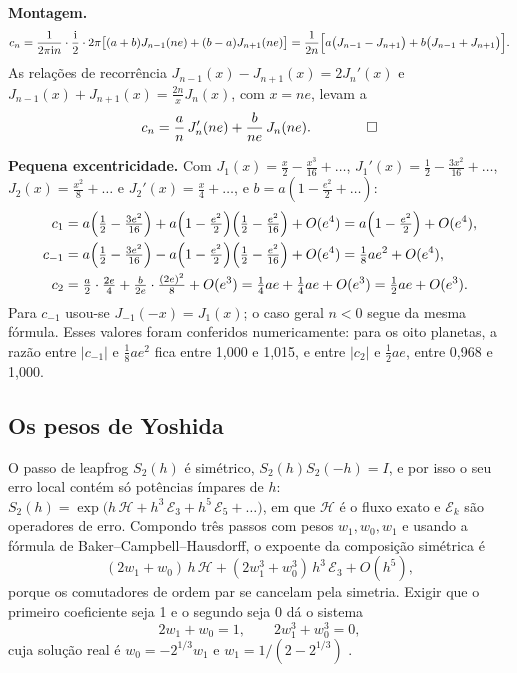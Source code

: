 \medskip\noindent\textbf{Montagem.}
\[
  c_n = \frac{1}{2\pi\mathrm{i} n}\cdot\frac{\mathrm{i}}{2}\cdot 2\pi\bigl[(a+b)J_{n-1}(ne) + (b-a)J_{n+1}(ne)\bigr]
      = \frac{1}{2n}\Bigl[a\bigl(J_{n-1}-J_{n+1}\bigr) + b\bigl(J_{n-1}+J_{n+1}\bigr)\Bigr].
\]
As relações de recorrência $J_{n-1}(x) - J_{n+1}(x) = 2J_n'(x)$ e $J_{n-1}(x)+J_{n+1}(x) = \frac{2n}{x}J_n(x)$, com $x = ne$, levam a
\[
  c_n = \frac{a}{n}\,J_n'(ne) + \frac{b}{ne}\,J_n(ne). \qquad\qed
\]

\medskip\noindent\textbf{Pequena excentricidade.} Com $J_1(x) = \frac x2 - \frac{x^3}{16} + \dots$, $J_1'(x) = \frac12 - \frac{3x^2}{16} + \dots$, $J_2(x) = \frac{x^2}{8} + \dots$ e $J_2'(x) = \frac{x}{4} + \dots$, e $b = a(1 - \frac{e^2}{2} + \dots)$:
\begin{align*}
  c_1 &= a\Bigl(\tfrac12 - \tfrac{3e^2}{16}\Bigr) + a\Bigl(1-\tfrac{e^2}{2}\Bigr)\Bigl(\tfrac12 - \tfrac{e^2}{16}\Bigr) + O(e^4) = a\Bigl(1 - \tfrac{e^2}{2}\Bigr) + O(e^4),\\
  c_{-1} &= a\Bigl(\tfrac12 - \tfrac{3e^2}{16}\Bigr) - a\Bigl(1-\tfrac{e^2}{2}\Bigr)\Bigl(\tfrac12 - \tfrac{e^2}{16}\Bigr) + O(e^4) = \tfrac18 ae^2 + O(e^4),\\
  c_2 &= \tfrac{a}{2}\cdot\tfrac{2e}{4} + \tfrac{b}{2e}\cdot\tfrac{(2e)^2}{8} + O(e^3) = \tfrac14 ae + \tfrac14 ae + O(e^3) = \tfrac12 ae + O(e^3).
\end{align*}
Para $c_{-1}$ usou-se $J_{-1}(-x) = J_1(x)$; o caso geral $n<0$ segue da mesma fórmula. Esses valores foram conferidos numericamente: para os oito planetas, a razão entre $|c_{-1}|$ e $\frac18 ae^2$ fica entre 1,000 e 1,015, e entre $|c_2|$ e $\frac12 ae$, entre 0,968 e 1,000.

\subsection{Os pesos de Yoshida}

O passo de leapfrog $S_2(h)$ é simétrico, $S_2(h)S_2(-h) = I$, e por isso o seu erro local contém só potências ímpares de $h$: $S_2(h) = \exp\bigl(h\,\mathcal{H} + h^3\,\mathcal{E}_3 + h^5\,\mathcal{E}_5 + \dots\bigr)$, em que $\mathcal{H}$ é o fluxo exato e $\mathcal{E}_k$ são operadores de erro. Compondo três passos com pesos $w_1, w_0, w_1$ e usando a fórmula de Baker--Campbell--Hausdorff, o expoente da composição simétrica é
\[
  (2w_1 + w_0)\,h\,\mathcal{H} + (2w_1^3 + w_0^3)\,h^3\,\mathcal{E}_3 + O(h^5),
\]
porque os comutadores de ordem par se cancelam pela simetria. Exigir que o primeiro coeficiente seja 1 e o segundo seja 0 dá o sistema
\[
  2w_1 + w_0 = 1,\qquad 2w_1^3 + w_0^3 = 0,
\]
cuja solução real é $w_0 = -2^{1/3}w_1$ e $w_1 = 1/(2-2^{1/3})$ \cite{yoshida1990}.
